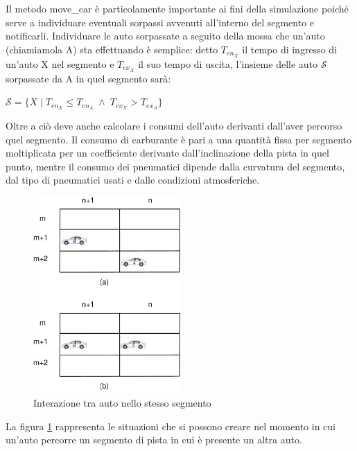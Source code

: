 \documentclass[11pt,a4paper]{report}
\begin{document}
Il metodo move\_car è particolamente importante ai fini della simulazione poiché serve a individuare eventuali sorpassi avvenuti all'interno del segmento e notificarli. Individuare le auto sorpassate a seguito della mossa che un'auto (chiamiamola A) sta effettuando è semplice: detto $T_{en_X}$ il tempo di ingresso di un'auto X nel segmento e $T_{ex_X}$ il suo tempo di uscita, l'insieme delle auto $\mathcal{S}$ sorpassate da A in quel segmento sarà:
\begin{center}
$\mathcal{S} = \{ X \; | \; T_{en_X} \leq T_{en_A} \; \wedge \; T_{ex_X} > T_{ex_A}\}$
\end{center}
Oltre a ciò deve anche calcolare i consumi dell'auto derivanti dall'aver percorso quel segmento.
Il consumo di carburante è pari a una quantità fissa per segmento moltiplicata per un coefficiente derivante dall'inclinazione della pista in quel punto, mentre il consumo dei pneumatici dipende dalla curvatura del segmento, dal tipo di pneumatici usati e dalle condizioni atmosferiche.

\begin{center}
\begin{figure}
\includegraphics[width=0.5\textwidth]{diagrammi/Surpass}
\caption{Interazione tra auto nello stesso segmento}
\label{fig:surpass}
\end{figure}
\end{center}
La figura \ref{fig:surpass} rappresenta le situazioni che si possono creare nel momento in cui un'auto percorre un segmento di pista in cui è presente un altra auto.
\end{document}

